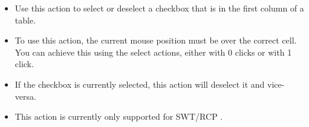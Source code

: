 

\begin{itemize}
\item Use this action to select or deselect a checkbox that is in the first column of a table.
\item To use this action, the current mouse position must be over the correct cell. You can achieve this using the select actions, either with 0 clicks or with 1 click.  
\item If the checkbox is currently selected, this action will deselect it and vice-versa.
\item This action is currently only supported for SWT/RCP \gdauts{}.
\end{itemize}
